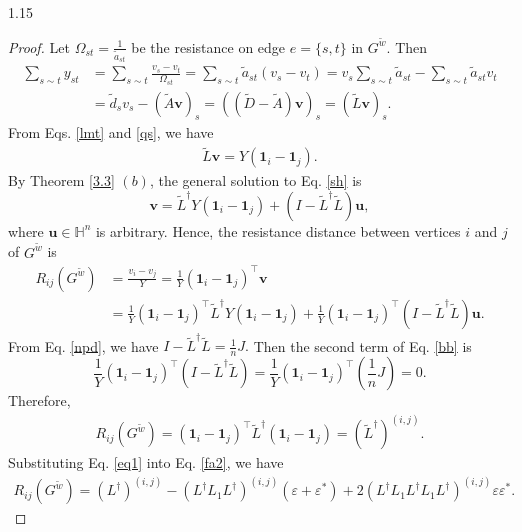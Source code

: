 \documentclass[preprint,12pt]{elsarticle1}
\numberwithin{equation}{section}
\begin{document}
\begin{spacing}{1.15}
\begin{proof}
Let $\Omega_{st}=\frac{1}{\widetilde{a}_{st}}$ be
 the resistance on edge $e=\{s,t\}$ in
 $G^{\widetilde{w}}$.
Then \begin{align}\nonumber
\sum_{s\sim t}y_{st}&=\sum_{s\sim t}\frac{v_{s}-v_{t}}{\Omega_{st}}=\sum_{s\sim t}\widetilde{a}_{st}(v_{s}-v_{t})=v_{s}\sum_{s\sim t}\widetilde{a}_{st}-\sum_{s\sim t}\widetilde{a}_{st}v_{t}\\ \label{qs}
&=\widetilde{d}_{s}v_{s}-(\widetilde{A}\textbf{v})_{s}=((\widetilde{D}-\widetilde{A})\textbf{v})_{s}=(\widetilde{L}\textbf{v})_{s}.
\end{align}
From Eqs. \eqref{lmt} and \eqref{qs}, we have
\begin{align}\label{sh}\widetilde{L}\textbf{v}=Y(\textbf{1}_{i}-\textbf{1}_{j}).\end{align}
By Theorem \ref{3.3} $(b)$, the general solution to Eq. \eqref{sh} is
 $$\textbf{v}=\widetilde{L}^{\dag} Y(\textbf{1}_{i}-\textbf{1}_{j})+(I-\widetilde{L}^{\dag}\widetilde{L})
\textbf{u},$$
where $\textbf{u}\in\mathbb{H}^{n}$ is arbitrary. Hence, the resistance distance between vertices $i$ and $j$ of $G^{\widetilde{w}}$ is\begin{align}\nonumber
R_{ij}(G^{\widetilde{w}})&=
\frac{v_{i}-v_{j}}{Y}=
\frac{1}{Y}(\textbf{1}_{i}-\textbf{1}_{j})^{\top}\textbf{v}\\ \label{bb}
&=\frac{1}{Y}(\textbf{1}_{i}-\textbf{1}_{j})^{\top}
\widetilde{L}^{\dag} Y(\textbf{1}_{i}-\textbf{1}_{j})+
\frac{1}{Y}(\textbf{1}_{i}-\textbf{1}_{j})^{\top}
(I-\widetilde{L}^{\dag}\widetilde{L})
\textbf{u}.\end{align}
From Eq. \eqref{npd}, we have $I-\widetilde{L}^{\dag}\widetilde{L}=\frac{1}{n}J.$
Then   the second term of Eq. \eqref{bb}  is $$\frac{1}{Y}(\textbf{1}_{i}-\textbf{1}_{j})^{\top}
(I-\widetilde{L}^{\dag}\widetilde{L})=
\frac{1}{Y}(\textbf{1}_{i}-\textbf{1}_{j})^{\top}(\frac{1}{n}J)=0.$$
Therefore,
\begin{align}\label{fa2}R_{ij}(G^{\widetilde{w}})
=(\textbf{1}_{i}-\textbf{1}_{j})^{\top}\widetilde{L}^{\dag} (\textbf{1}_{i}-\textbf{1}_{j})=(\widetilde{L}^{\dag})^{(i,j)}.\end{align}
Substituting Eq. \eqref{eq1} into Eq. \eqref{fa2}, we have
\begin{align}\nonumber R_{ij}(G^{\widetilde{w}})
=(L^{\dag})^{(i,j)}-
(L^{\dag}L_{1}L^{\dag})^{(i,j)}(\varepsilon
+\varepsilon^{*})
+2(L^{\dag}L_{1}L^{\dag}L_{1}L^{\dag})^{(i,j)}
\varepsilon\varepsilon^{*}.
\end{align}


\end{proof}
\end{spacing}
\end{document}
